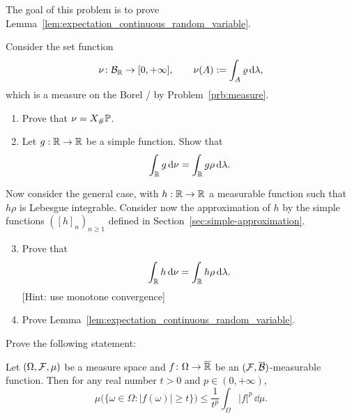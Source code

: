 \begin{problem}\label{prb:expectation_continuous_random_variable}
The goal of this problem is to prove Lemma~\ref{lem:expectation_continuous_random_variable}. 

Consider the set function
\[
	\nu\colon \mathcal B_{\mathbb R} \to [0,+\infty],\qquad\nu(A) := \int_A \varrho\, \mathrm{d} \lambda,
\]
which is a measure on the Borel \sigalg/ by Problem~\ref{prb:measure}.
\begin{enumerate}[label=(\alph*)]
\item Prove that $\nu = X_\# \mathbb P$.
\item Let $g : \mathbb R \to \mathbb R$ be a simple function. Show that
\[
	\int_{\mathbb R} g \, \mathrm{d} \nu = \int_{\mathbb R} g \rho \, \mathrm{d} \lambda.
\]
\end{enumerate}

Now consider the general case, with $h : \mathbb R \to \mathbb R$ a measurable function such that $h \rho$ is Lebesgue integrable. Consider now the approximation of $h$ by the simple functions $([h]_n)_{n \ge 1}$ defined in Section~\ref{sec:simple-approximation}.
\begin{enumerate}[label=(\alph*)]
\setcounter{enumi}{2}
\item Prove that 
\[
	\int_{\mathbb R} h \, \mathrm{d} \nu = \int_{\mathbb R} h \rho \, \mathrm{d} \lambda.
\]
[Hint: use monotone convergence]
\item Prove Lemma~\ref{lem:expectation_continuous_random_variable}.
\end{enumerate}
\end{problem}

\begin{problem}
	Prove the following statement: 
	
	\smallskip
	Let $(\Omega,\mathcal F,\mu)$ be a measure space and $f\colon \Omega\to \overline{\mathbb R}$ be an $(\mathcal F,\overline{\mathcal B})$-measurable function. Then for any real number $t>0$ and $p\in(0,+\infty)$,
	\[
		\mu\bigl(\{\omega\in\Omega : |f(\omega)|\ge t\}\bigr) \le \frac{1}{t^p}\int_\Omega |f|^p\,\dd\mu.
	\]
\end{problem}
